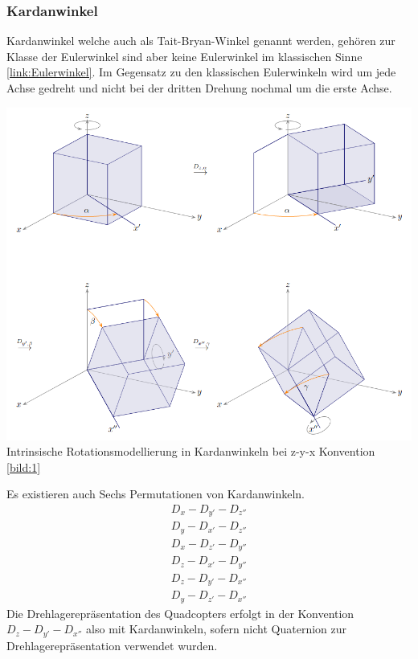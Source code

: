 \subsubsection{Kardanwinkel}
Kardanwinkel welche auch als Tait-Bryan-Winkel genannt werden, gehören zur Klasse der Eulerwinkel sind aber keine Eulerwinkel im klassischen Sinne \ref{link:Eulerwinkel}. Im Gegensatz zu den klassischen Eulerwinkeln wird um jede Achse gedreht und nicht bei der dritten Drehung nochmal um die erste Achse.
\begin{center}
	\includegraphics[scale=0.5]{../images/0028 Kardanwinkel.png}{\\Intrinsische Rotationsmodellierung in Kardanwinkeln bei z-y-x Konvention \ref{bild:1}}
\end{center}
Es existieren auch Sechs Permutationen von Kardanwinkeln. 
\begin{align}
	D_x-D_{y'}-D_{z''}\\
	D_y-D_{x'}-D_{z''}\\
	D_x-D_{z'}-D_{y''}\\
	D_z-D_{x'}-D_{y''}\\
	D_z-D_{y'}-D_{x''}\\
	D_y-D_{z'}-D_{x''}
\end{align}
Die Drehlagerepräsentation des Quadcopters erfolgt in der Konvention $D_z-D_{y'}-D_{x''}$ also mit Kardanwinkeln, sofern nicht Quaternion zur Drehlagerepräsentation verwendet wurden.


